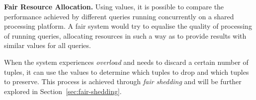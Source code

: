 \textbf{Fair Resource Allocation.} Using \sic values, it is possible to compare the performance
achieved by different queries running concurrently on a shared processing platform. A fair system would
try to equalise the quality of processing of running queries, allocating resources in such a way as to
provide results with similar \sic values for all queries.

When the system experiences \emph{overload} and needs to discard a certain number of tuples, it can use
the \sic values to determine which tuples to drop and which tuples to preserve. This process is achieved
through \emph{fair shedding} and will be further explored in Section~\ref{sec:fair-shedding}.
\vspace{-10pt}
